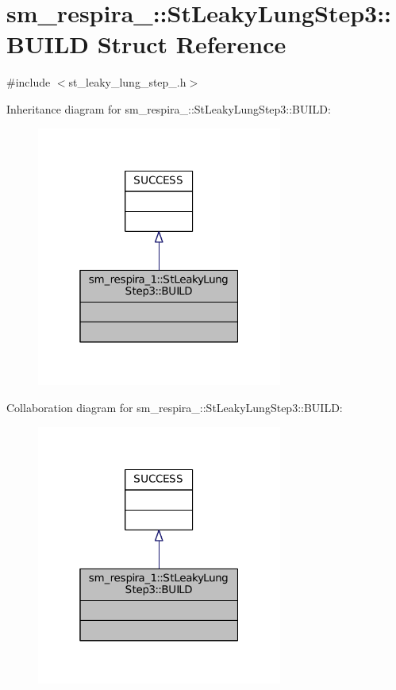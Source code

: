 \hypertarget{structsm__respira__1_1_1StLeakyLungStep3_1_1BUILD}{}\section{sm\+\_\+respira\+\_\+:\+:St\+Leaky\+Lung\+Step3\+:\+:B\+U\+I\+LD Struct Reference}
\label{structsm__respira__1_1_1StLeakyLungStep3_1_1BUILD}


{\ttfamily \#include $<$st\+\_\+leaky\+\_\+lung\+\_\+step\+\_.\+h$>$}



Inheritance diagram for sm\+\_\+respira\+\_\+:\+:St\+Leaky\+Lung\+Step3\+:\+:B\+U\+I\+LD\+:
\nopagebreak
\begin{figure}[H]
\begin{center}
\leavevmode
\includegraphics[width=229pt]{structsm__respira__1_1_1StLeakyLungStep3_1_1BUILD__inherit__graph}
\end{center}
\end{figure}


Collaboration diagram for sm\+\_\+respira\+\_\+:\+:St\+Leaky\+Lung\+Step3\+:\+:B\+U\+I\+LD\+:
\nopagebreak
\begin{figure}[H]
\begin{center}
\leavevmode
\includegraphics[width=229pt]{structsm__respira__1_1_1StLeakyLungStep3_1_1BUILD__coll__graph}
\end{center}
\end{figure}


